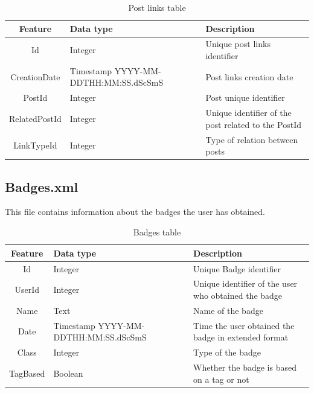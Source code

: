 \documentclass[11pt]{book} %
\begin{document}
      \begin{table}[!ht]
        \begin{tabular}{|c|p{}|p{}|}
          \hline

          Feature & Data type & Description \\ \hline
          Id & Integer & Unique post links identifier \\
          CreationDate & Timestamp YYYY-MM-DDTHH:MM:SS.dScSmS & Post links creation date \\ \hline
          PostId & Integer & Post unique identifier \\ \hline
          RelatedPostId & Integer & Unique identifier of the post related to the PostId \\ \hline
          LinkTypeId & Integer & Type of relation between posts \\

          \hline
        \end{tabular}
        \caption{Post links table}
        \label{tab:postlinks}
      \end{table}

    \subsection{Badges.xml}

      This file contains information about the badges the user has obtained.

      \begin{table}[!ht]
        \centering
        \begin{tabular}{|c|p{}|p{}|}
          \hline

          Feature & Data type & Description \\ \hline
          Id & Integer & Unique Badge identifier \\ \hline
          UserId & Integer & Unique identifier of the user who obtained the badge \\ \hline
          Name & Text & Name of the badge \\ \hline
          Date & Timestamp YYYY-MM-DDTHH:MM:SS.dScSmS & Time the user obtained the badge in extended format \\ \hline
          Class & Integer & Type of the badge \\ \hline
          TagBased & Boolean & Whether the badge is based on a tag or not \\

          \hline
        \end{tabular}
        \caption{Badges table}
        \label{tab:badges}
      \end{table}
\end{document}
